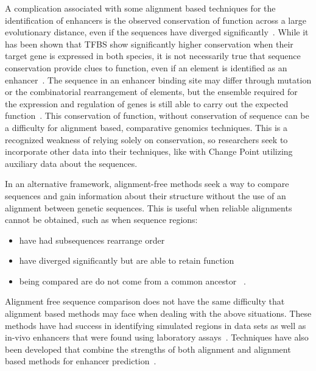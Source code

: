          A complication associated with some alignment based techniques for the identification of enhancers is the observed conservation of function across a large evolutionary distance, even if the sequences have diverged significantly~\cite{tautz2000evolution, pennacchio2013enhancers}. While it has been shown that TFBS show significantly higher conservation when their target gene is expressed in both species, it is not necessarily true that sequence conservation provide clues to function, even if an element is identified as an enhancer~\cite{hemberg2011conservation, pennacchio2013enhancers}.
         The sequence in an enhancer binding site may differ through mutation or the combinatorial rearrangement of elements, but the ensemble required for the expression and regulation of genes is still able to carry out the expected function~\cite{wong2014decoupling}. This conservation of function, without conservation of sequence can be a difficulty for alignment based, comparative genomics techniques. This is a recognized weakness of relying solely on conservation, so researchers seek to incorporate other data into their techniques, like with Change Point utilizing auxiliary data about the sequences. 
        
        In an alternative framework, alignment-free methods seek a way to compare sequences and gain information about their structure without the use of an alignment between genetic sequences. 
        This is useful when reliable alignments cannot be obtained, such as when sequence regions: 
            \begin{itemize}
                \item have had subsequences rearrange order%
                \item have diverged significantly but are able to retain function
                \item being compared are do not come from a common ancestor ~\cite{song2013new}.
            \end{itemize}
        Alignment free sequence comparison does not have the same difficulty that alignment based methods may face when dealing with the above situations. These methods have had success in identifying simulated regions in data sets as well as in-vivo enhancers that were found using laboratory assays~\cite{goke2012estimation}. Techniques have also been developed that combine the strengths of both alignment and alignment based methods for enhancer prediction~\cite{dolle2015handling}. 
        
